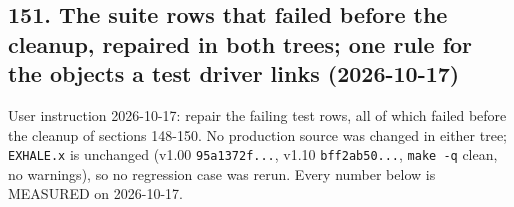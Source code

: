 \documentclass[english,a4paper]{my_memo}
\begin{document}
\subsection{151. The suite rows that failed before the cleanup, repaired in both trees; one rule for the objects a test driver links (2026-10-17)}\label{151-the-suite-rows-that-failed-before-the-cleanup-repaired-in-both-trees-one-rule-for-the-objects-a-test-driver-links-2026-10-17}

User instruction 2026-10-17: repair the failing test rows, all of which failed before the cleanup of sections 148-150. No production source was changed in either tree; \texttt{EXHALE.x} is unchanged (v1.00 \texttt{95a1372f...}, v1.10 \texttt{bff2ab50...}, \texttt{make\ -q} clean, no warnings), so no regression case was rerun. Every number below is MEASURED on 2026-10-17.
\end{document}
